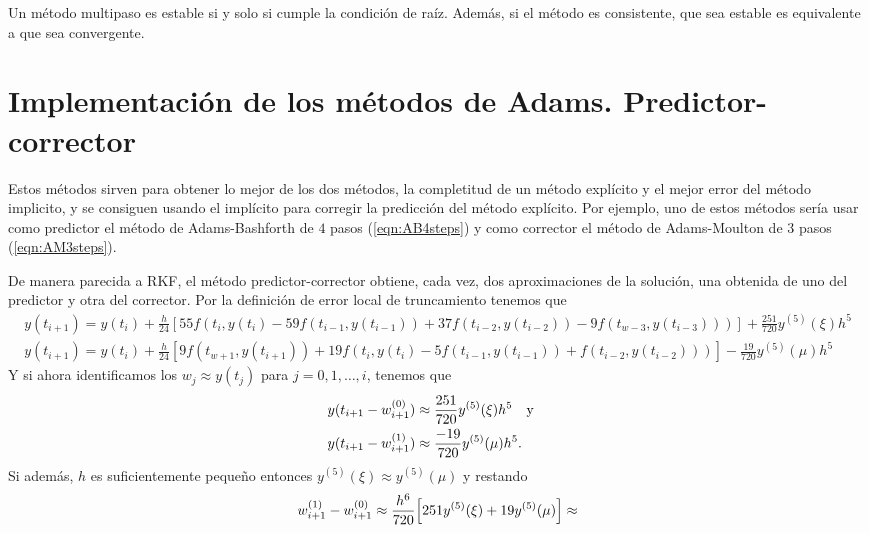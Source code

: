 \begin{theorem}
    Un método multipaso es estable si y solo si cumple la condición de raíz.
    Además, si el método es consistente,
    que sea estable es equivalente a que sea convergente.
\end{theorem}

\section{Implementación de los métodos de Adams. Predictor-corrector}

Estos métodos sirven para obtener lo mejor de los dos métodos,
la completitud de un método explícito y el mejor error del
método implicito, y se consiguen usando el implícito para corregir
la predicción del método explícito.
Por ejemplo, uno de estos métodos  sería usar como predictor
el método de Adams-Bashforth de $4$ pasos (\cref{eqn:AB4steps})
y como corrector el método de Adams-Moulton de $3$ pasos (\cref{eqn:AM3steps}).

De manera parecida a RKF, %
el método predictor-corrector obtiene, cada vez,
dos aproximaciones de la solución,
una obtenida de uno del predictor y otra del corrector.
Por la definición de error local de truncamiento tenemos que
\begin{gather*}
    y(t_{i+1}) = y(t_i) + \frac{h}{24}[
        55f(t_i,y(t_i) - 59f(t_{i-1},y(t_{i-1})) + 37f(t_{i-2}, y(t_{i-2}))
        - 9f(t_{w-3},y(t_{i-3})))
    ] + \frac{251}{720}y^{(5)}(\xi)h^5  \\
    y(t_{i+1}) = y(t_i) + \frac{h}{24}[
        9f(t_{w+1},y(t_{i+1})) + 19f(t_i,y(t_i) - 5f(t_{i-1},y(t_{i-1}))
        + f(t_{i-2}, y(t_{i-2})))
    ] - \frac{19}{720}y^{(5)}(\mu)h^5
\end{gather*}
Y si ahora identificamos los $w_j \approx y(t_j)$ para $j = 0,1,\dots, i$,
tenemos que
\begin{align*}
    y(t_{i+1} - w_{i+1}^{(0)}) \approx {} &
        \frac{251}{720}y^{(5)}(\xi)h^5 \qq{y} \\
    y(t_{i+1} - w_{i+1}^{(1)}) \approx {} &
        \frac{-19}{720}y^{(5)}(\mu)h^5.
\end{align*}
Si además, $h$ es suficientemente pequeño entonces
$y^{(5)}(\xi) \approx y^{(5)}(\mu)$
y restando
\begin{equation*}
    w_{i+1}^{(1)} - w_{i+1}^{(0)} \approx
    \frac{h^6}{720}\qty[251y^{(5)}(\xi) + 19y^{(5)}(\mu)] \approx
\end{equation*}

